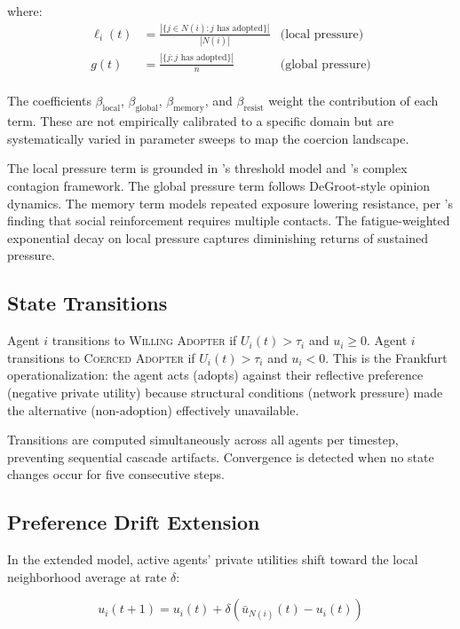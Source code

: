 \documentclass[11pt, a4paper]{article}
\newcommand{\betalocal}{\beta_{\text{local}}}
\newcommand{\betaglobal}{\beta_{\text{global}}}
\newcommand{\betamemory}{\beta_{\text{memory}}}
\newcommand{\betaresist}{\beta_{\text{resist}}}
\begin{document}
\noindent where:
\begin{align*}
    \ell_i(t) &= \frac{|\{j \in N(i) : j \text{ has adopted}\}|}{|N(i)|} & \text{(local pressure)} \\
    g(t) &= \frac{|\{j : j \text{ has adopted}\}|}{n} & \text{(global pressure)} \\
\end{align*}

The coefficients $\betalocal$, $\betaglobal$, $\betamemory$, and $\betaresist$ weight the contribution of each term. These are not empirically calibrated to a specific domain but are systematically varied in parameter sweeps to map the coercion landscape.

The local pressure term is grounded in \citeauthor{granovetter1978threshold}'s threshold model and \citeauthor{centola2007complex}'s complex contagion framework. The global pressure term follows DeGroot-style opinion dynamics. The memory term models repeated exposure lowering resistance, per \citeauthor{centola2010spread}'s finding that social reinforcement requires multiple contacts. The fatigue-weighted exponential decay on local pressure captures diminishing returns of sustained pressure.

\subsection{State Transitions}

Agent $i$ transitions to \textsc{Willing Adopter} if $U_i(t) > \tau_i$ and $u_i \geq 0$. Agent $i$ transitions to \textsc{Coerced Adopter} if $U_i(t) > \tau_i$ and $u_i < 0$. This is the Frankfurt operationalization: the agent acts (adopts) against their reflective preference (negative private utility) because structural conditions (network pressure) made the alternative (non-adoption) effectively unavailable.

Transitions are computed simultaneously across all agents per timestep, preventing sequential cascade artifacts. Convergence is detected when no state changes occur for five consecutive steps.

\subsection{Preference Drift Extension}

In the extended model, active agents' private utilities shift toward the local neighborhood average at rate $\delta$:

\begin{equation}
    u_i(t+1) = u_i(t) + \delta \left( \bar{u}_{N(i)}(t) - u_i(t) \right)
    \label{eq:drift}
\end{equation}
\end{document}
